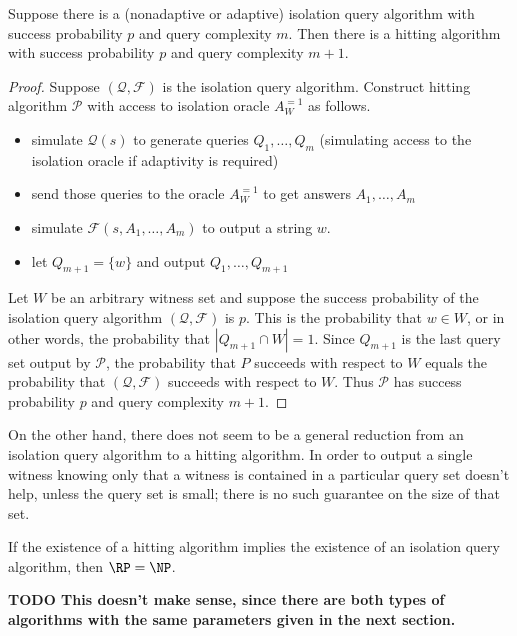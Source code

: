 \documentclass{article}
\newcommand{\todo}[1]{\textbf{TODO #1}}
\newcommand{\mc}{\mathcal}
\begin{document}
\begin{lemma}\label{lem:reduction}
  Suppose there is a (nonadaptive or adaptive) isolation query algorithm with success probability $p$ and query complexity $m$.
  Then there is a hitting algorithm with success probability $p$ and query complexity $m + 1$.
\end{lemma}
\begin{proof}
  Suppose $(\mc{Q}, \mc{F})$ is the isolation query algorithm.
  Construct hitting algorithm $\mc{P}$ with access to isolation oracle $A^{=1}_W$ as follows.
  \begin{itemize}
  \item simulate $\mc{Q}(s)$ to generate queries $Q_1, \dotsc, Q_m$ (simulating access to the isolation oracle if adaptivity is required)
  \item send those queries to the oracle $A^{=1}_W$ to get answers $A_1, \dotsc, A_m$
  \item simulate $\mc{F}(s, A_1, \dotsc, A_m)$ to output a string $w$.
  \item let $Q_{m + 1} = \{ w \}$ and output $Q_1, \dotsc, Q_{m + 1}$
  \end{itemize}

  Let $W$ be an arbitrary witness set and suppose the success probability of the isolation query algorithm $(\mc{Q}, \mc{F})$ is $p$.
  This is the probability that $w \in W$, or in other words, the probability that $|Q_{m + 1} \cap W| = 1$.
  Since $Q_{m + 1}$ is the last query set output by $\mc{P}$, the probability that $P$ succeeds with respect to $W$ equals the probability that $(\mc{Q}, \mc{F})$ succeeds with respect to $W$.
  Thus $\mc{P}$ has success probability $p$ and query complexity $m + 1$.
\end{proof}

On the other hand, there does not seem to be a general reduction from an isolation query algorithm to a hitting algorithm.
In order to output a single witness knowing only that a witness is contained in a particular query set doesn't help, unless the query set is small; there is no such guarantee on the size of that set.

\begin{conjecture}
  If the existence of a hitting algorithm implies the existence of an isolation query algorithm, then $\RP = \NP$.

  \todo{This doesn't make sense, since there are both types of algorithms with the same parameters given in the next section.}
\end{conjecture}
\end{document}
